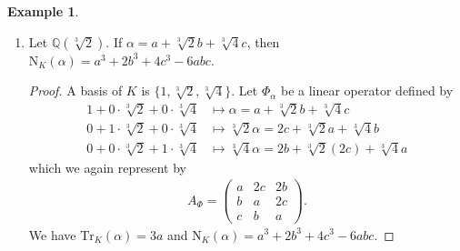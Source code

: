 \documentclass[a4paper]{book}
\theoremstyle{definition}
\newtheorem{example}{Example}[definition]
\begin{document}
\begin{example}
\begin{enumerate}
\begin{proof}
\begin{align*}
            A_{\Phi} = \begin{pmatrix}
                a & db \\
                b & a
            \end{pmatrix} \text{.}
        \end{align*}
        We have \(\mathrm{Tr}_K(\alpha) = 2a\) and \(\mathrm{N}_K(\alpha) = a^2 - db^2\) matching the results in our previous examples.
    \end{proof}
    \item Let \(\mathbb{Q}(\sqrt[3]{2})\). If \(\alpha = a + \sqrt[3]{2} b + \sqrt[3]{4} c\), then \(\mathrm{N}_K(\alpha) = a^3 + 2b^3 + 4c^3 - 6abc\).
    \begin{proof}
        A basis of \(K\) is \(\{1, \sqrt[3]{2}, \sqrt[3]{4}\}\). Let \(\Phi_\alpha\) be a linear operator defined by
        \begin{align*}
            1 + 0 \cdot \sqrt[3]{2} + 0 \cdot \sqrt[3]{4} &\mapsto \alpha = a + \sqrt[3]{2} b + \sqrt[3]{4} c \\
            0 + 1 \cdot \sqrt[3]{2} + 0 \cdot \sqrt[3]{4} &\mapsto \sqrt[3]{2} \alpha = 2 c + \sqrt[3]{2}a + \sqrt[3]{4} b \\
            0 + 0 \cdot \sqrt[3]{2} + 1 \cdot \sqrt[3]{4} & \mapsto \sqrt[3]{4} \alpha = 2b + \sqrt[3]{2} (2c) + \sqrt[3]{4} a
        \end{align*}
        which we again represent by
        \begin{align*}
            A_\Phi = 
            \begin{pmatrix}
                a & 2c & 2b \\
                b & a & 2c \\
                c & b & a
            \end{pmatrix} \text{.}
        \end{align*}
        We have \(\mathrm{Tr}_K(\alpha) = 3a\) and \(\mathrm{N}_K(\alpha) = a^3 + 2b^3 + 4c^3 - 6abc\).
    \end{proof}
    \end{enumerate}
\end{example}
\end{document}
